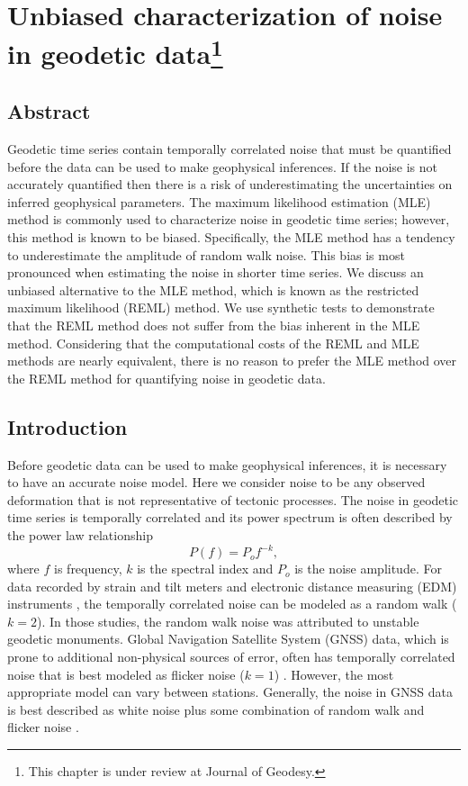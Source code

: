 \chapter
[Unbiased characterization of noise in geodetic data]
{Unbiased characterization of noise in geodetic data\footnote[2]{
This chapter is under review at Journal of Geodesy.}} 


\section{Abstract}
Geodetic time series contain temporally correlated noise that must be
quantified before the data can be used to make geophysical inferences.
If the noise is not accurately quantified then there is a risk of
underestimating the uncertainties on inferred geophysical parameters.
The maximum likelihood estimation (MLE) method is commonly used to
characterize noise in geodetic time series; however, this method is
known to be biased. Specifically, the MLE method has a tendency to
underestimate the amplitude of random walk noise. This bias is most
pronounced when estimating the noise in shorter time series. We
discuss an unbiased alternative to the MLE method, which is known as
the restricted maximum likelihood (REML) method. We use synthetic
tests to demonstrate that the REML method does not suffer from the
bias inherent in the MLE method. Considering that the computational
costs of the REML and MLE methods are nearly equivalent, there is no
reason to prefer the MLE method over the REML method for quantifying
noise in geodetic data.

\section{Introduction}\label{ch4:sec:Introduction}
Before geodetic data can be used to make geophysical inferences, it is
necessary to have an accurate noise model. Here we consider noise to
be any observed deformation that is not representative of tectonic
processes. The noise in geodetic time series is temporally correlated
and its power spectrum is often described by the power law
relationship \citep{Agnew1992}
\begin{equation}\label{eq.PowerLaw}
  P(f) = P_o f^{-k},
\end{equation}
where $f$ is frequency, $k$ is the spectral index and $P_o$ is the
noise amplitude. For data recorded by strain and tilt meters
\citep{Wyatt1982,Wyatt1989} and electronic distance measuring (EDM)
instruments \citep{Langbein1997}, the temporally correlated noise can
be modeled as a random walk ($k = 2$). In those studies, the random
walk noise was attributed to unstable geodetic monuments. Global
Navigation Satellite System (GNSS) data, which is prone to additional
non-physical sources of error, often has temporally correlated noise
that is best modeled as flicker noise ($k = 1$)
\citep[e.g.,][]{Zhang1997,Mao1999,Williams2004}. However, the most
appropriate model can vary between stations. Generally, the noise in
GNSS data is best described as white noise plus some combination of
random walk and flicker noise \citep{Langbein2008}.

